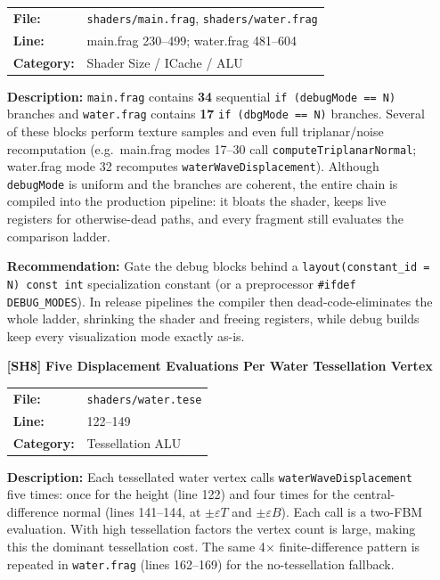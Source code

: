 \documentclass[a4paper,12pt]{article}
\newcommand{\severitybox}[2]{%
  \colorbox{#1}{\makebox[2.5cm][c]{\textcolor{white}{\textbf{#2}}}}%
}
\begin{document}
\begin{enumerate}[leftmargin=*]
  \begin{tabular}{ll}
    \textbf{File:} & \texttt{shaders/main.frag}, \texttt{shaders/water.frag} \\
    \textbf{Line:} & main.frag 230--499; water.frag 481--604 \\
    \textbf{Category:} & Shader Size / ICache / ALU \\
  \end{tabular}

  \textbf{Description:}
  \texttt{main.frag} contains \textbf{34} sequential \texttt{if (debugMode == N)}
  branches and \texttt{water.frag} contains \textbf{17} \texttt{if (dbgMode == N)}
  branches. Several of these blocks perform texture samples and even full
  triplanar/noise recomputation (e.g.\ main.frag modes 17--30 call
  \texttt{computeTriplanarNormal}; water.frag mode 32 recomputes
  \texttt{waterWaveDisplacement}). Although \texttt{debugMode} is uniform and the
  branches are coherent, the entire chain is compiled into the production
  pipeline: it bloats the shader, keeps live registers for otherwise-dead paths,
  and every fragment still evaluates the comparison ladder.

  \textbf{Recommendation:}
  Gate the debug blocks behind a \texttt{layout(constant\_id = N) const int}
  specialization constant (or a preprocessor \texttt{\#ifdef DEBUG\_MODES}). In
  release pipelines the compiler then dead-code-eliminates the whole ladder,
  shrinking the shader and freeing registers, while debug builds keep every
  visualization mode exactly as-is.

\item[\textbf{[SH8]}] \textbf{Five Displacement Evaluations Per Water Tessellation Vertex}
  \hfill \severitybox{mediumcolor}{MEDIUM}

  \begin{tabular}{ll}
    \textbf{File:} & \texttt{shaders/water.tese} \\
    \textbf{Line:} & 122--149 \\
    \textbf{Category:} & Tessellation ALU \\
  \end{tabular}

  \textbf{Description:}
  Each tessellated water vertex calls \texttt{waterWaveDisplacement} five times:
  once for the height (line 122) and four times for the central-difference
  normal (lines 141--144, at $\pm\varepsilon T$ and $\pm\varepsilon B$). Each
  call is a two-FBM evaluation. With high tessellation factors the vertex count
  is large, making this the dominant tessellation cost. The same 4$\times$
  finite-difference pattern is repeated in \texttt{water.frag} (lines 162--169)
  for the no-tessellation fallback.


\end{enumerate}
\end{document}
